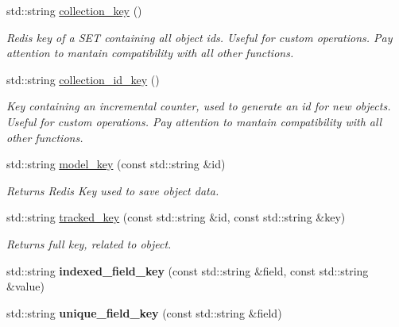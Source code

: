 \begin{DoxyCompactItemize}
\item 
std\-::string \hyperlink{classredis3m_1_1patterns_1_1orm_a520433866ecfba1b4679d04af46603f3}{collection\-\_\-key} ()
\begin{DoxyCompactList}\small\item\em Redis key of a S\-E\-T containing all object ids. Useful for custom operations. Pay attention to mantain compatibility with all other functions. \end{DoxyCompactList}\item 
std\-::string \hyperlink{classredis3m_1_1patterns_1_1orm_a75199bb02a7e188a9cf60fdbbc4ec0be}{collection\-\_\-id\-\_\-key} ()
\begin{DoxyCompactList}\small\item\em Key containing an incremental counter, used to generate an id for new objects. Useful for custom operations. Pay attention to mantain compatibility with all other functions. \end{DoxyCompactList}\item 
std\-::string \hyperlink{classredis3m_1_1patterns_1_1orm_ad4232c86962fdb91a206fa3f78dabaa6}{model\-\_\-key} (const std\-::string \&id)
\begin{DoxyCompactList}\small\item\em Returns Redis Key used to save object data. \end{DoxyCompactList}\item 
std\-::string \hyperlink{classredis3m_1_1patterns_1_1orm_ad1b2ed504968d06a941588374c92b0ba}{tracked\-\_\-key} (const std\-::string \&id, const std\-::string \&key)
\begin{DoxyCompactList}\small\item\em Returns full key, related to object. \end{DoxyCompactList}\item 
\hypertarget{classredis3m_1_1patterns_1_1orm_ab18df7a4c6412ea15fd79d8b686a3757}{std\-::string {\bfseries indexed\-\_\-field\-\_\-key} (const std\-::string \&field, const std\-::string \&value)}\label{classredis3m_1_1patterns_1_1orm_ab18df7a4c6412ea15fd79d8b686a3757}

\item 
\hypertarget{classredis3m_1_1patterns_1_1orm_a4bf7085f7752f334e8070b3ca3f44ebf}{std\-::string {\bfseries unique\-\_\-field\-\_\-key} (const std\-::string \&field)}\label{classredis3m_1_1patterns_1_1orm_a4bf7085f7752f334e8070b3ca3f44ebf}

\end{DoxyCompactItemize}


